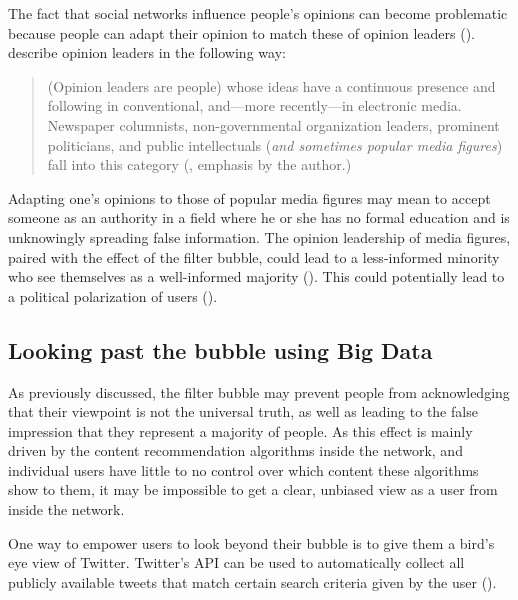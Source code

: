The fact that social networks influence people's opinions can become problematic because people can adapt their opinion to match these of opinion leaders (\cite{altafiniDynamicsOpinionForming2012}). \citeauthor{gokceTwitterPoliticsIdentifying2014} describe opinion leaders in the following way:

\begin{quote}
    (Opinion leaders are people) whose ideas have a continuous presence and following in conventional, and—more recently—in electronic media. Newspaper columnists, non-governmental organization leaders, prominent politicians, and public intellectuals (\emph{and sometimes popular media ﬁgures}) fall into this category (\cite[673]{gokceTwitterPoliticsIdentifying2014}, emphasis by the author.)
\end{quote}

Adapting one's opinions to those of popular media figures may mean to accept someone as an authority in a field where he or she has no formal education and is unknowingly spreading false information. The opinion leadership of media figures, paired with the effect of the filter bubble, could lead to a less-informed minority who see themselves as a well-informed majority (\cite{moscoviciSilentMajoritiesLoud1991}). This could potentially lead to a political polarization of users (\cite{kobayashiDepolarizationSocialMedia2020}).


\subsection{Looking past the bubble using Big Data}
As previously discussed, the filter bubble may prevent people from acknowledging that their viewpoint is not the universal truth, as well as leading to the false impression that they represent a majority of people. As this effect is mainly driven by the content recommendation algorithms inside the network, and individual users have little to no control over which content these algorithms show to them, it may be impossible to get a clear, unbiased view as a user from inside the network.

One way to empower users to look beyond their bubble is to give them a bird's eye view of Twitter. Twitter's API can be used to automatically collect all publicly available tweets that match certain search criteria given by the user (\cite{twitterinc.TwitterAPIs}).

